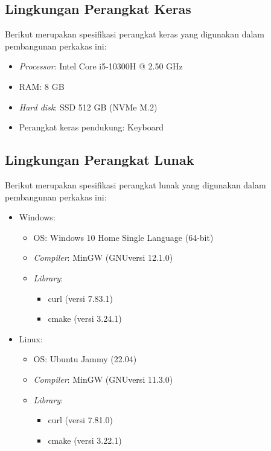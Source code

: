 \subsection{Lingkungan Perangkat Keras}
\label{sec:testing-experiments-hardware}

Berikut merupakan spesifikasi perangkat keras yang digunakan dalam pembangunan perkakas ini:

\begin{itemize}
	\item \textit{Processor}: Intel\logoregistered\xspace Core\logotrademark\xspace i5-10300H @ 2.50 GHz
	\item RAM: 8 GB
	\item \textit{Hard disk}: SSD 512 GB (NVMe\logotrademark\xspace M.2)
	\item Perangkat keras pendukung: Keyboard
\end{itemize}

\subsection{Lingkungan Perangkat Lunak}
\label{sec:testing-experiments-software}

Berikut merupakan spesifikasi perangkat lunak yang digunakan dalam pembangunan perkakas ini:

\begin{itemize}
	\item Windows:
	
	\begin{itemize}
		\item OS: Windows 10 Home Single Language (64-bit)
		\item \textit{Compiler}: MinGW (GNU\textemdash versi 12.1.0)
		\item \textit{Library}:
		
		\begin{itemize}
			\item curl (versi 7.83.1)
			\item cmake (versi 3.24.1)
		\end{itemize}
		
	\end{itemize}
	
	\item Linux:
	
	\begin{itemize}
		\item OS: Ubuntu Jammy (22.04)
		\item \textit{Compiler}: MinGW (GNU\textemdash versi 11.3.0)
		\item \textit{Library}:
		
		\begin{itemize}
			\item curl (versi 7.81.0)
			\item cmake (versi 3.22.1)
		\end{itemize}
		
	\end{itemize}
	
\end{itemize}

